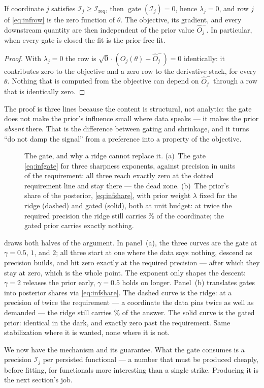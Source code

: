 \begin{proposition}
\label{prop:infnodamp}
If coordinate $j$ satisfies
$\mathcal{I}_j\ge\mathcal{I}_{\mathrm{req}}$, then
$\operatorname{gate}(\mathcal{I}_j)=0$, hence $\lambda_j=0$, and row
$j$ of \cref{eq:infrow} is the zero function of $\theta$.  The
objective, its gradient, and every downstream quantity are then
independent of the prior value $\hat O_j^{-}$.  In particular, when
every gate is closed the fit is the prior-free fit.
\end{proposition}

\begin{proof}
With $\lambda_j=0$ the row is $\sqrt{0}\cdot(O_j(\theta)-\hat
O_j^{-})=0$ identically: it contributes zero to the objective and a
zero row to the derivative stack, for every $\theta$.  Nothing that
is computed from the objective can depend on $\hat O_j^{-}$ through
a row that is identically zero.
\end{proof}

The proof is three lines because the content is structural, not
analytic: the gate does not make the prior's influence small where
data speaks --- it makes the prior \emph{absent} there.  That is the
difference between gating and shrinkage, and it turns ``do not damp
the signal'' from a preference into a property of the objective.

\begin{figure}[htbp]
\centering
{}
\caption{The gate, and why a ridge cannot replace it.  (a)~The gate
\cref{eq:infgate} for three sharpness exponents, against precision in
units of the requirement: all three reach exactly zero at the dotted
requirement line and stay there --- the dead zone.  (b)~The prior's
share of the posterior, \cref{eq:infshare}, with prior
weight $\lambda$ fixed for the ridge (dashed) and gated (solid), both
at unit budget: at twice the required precision the ridge still
carries \MacPriorGateRidgeSharePct\% of the coordinate; the gated
prior carries exactly nothing.}
\label{fig:infgate}
\end{figure}

 draws both halves of the argument.  In
panel~(a), the three curves are the gate at $\gamma=0.5$, $1$, and
$2$; all three start at one where the data says nothing, descend as
precision builds, and hit zero exactly at the required precision ---
after which they stay at zero, which is the whole point.  The
exponent only shapes the descent: $\gamma=2$ releases the prior
early, $\gamma=0.5$ holds on longer.  Panel~(b) translates gates
into posterior shares via \cref{eq:infshare}.  The dashed curve is
the ridge: at a precision of twice the requirement --- a coordinate
the data pins twice as well as demanded --- the ridge still carries
\MacPriorGateRidgeSharePct\% of the answer.  The solid curve is the
gated prior: identical in the dark, and exactly zero past the
requirement.  Same stabilization where it is wanted, none where it
is not.

We now have the mechanism and its guarantee.  What the gate consumes
is a precision $\mathcal{I}_j$ per persisted functional --- a number
that must be produced cheaply, before fitting, for functionals more
interesting than a single strike.  Producing it is the next
section's job.
